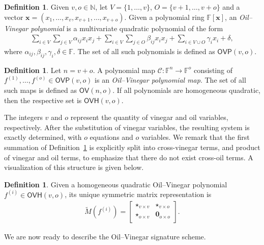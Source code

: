 \documentclass[12pt, a4paper, oneside]{memoir}
\theoremstyle{definition}
\newtheorem{definition}[theorem]{Definition}
\begin{document}
\begin{definition}\label{def:oil-vinegar-poly}
  Given $v, o \in \mathbb{N}$, let $V = \{1, \dots, v\}$, $O = \{v + 1, \dots, v + o\}$ and a vector $\mathbf{x} = (x_{1}, \dots, x_{v}, x_{v + 1}, \dots, x_{v + o})$. Given a polynomial ring $\mathbb{F}[\mathbf{x}]$, an \emph{Oil--Vinegar polynomial} is a multivariate quadratic polynomial of the form
  \begin{align}
    \sum_{i \in V} \sum_{j \in V} \alpha_{ij} x_{i} x_{j}
      + \sum_{i \in V} \sum_{j \in O} \beta_{ij} x_{i} x_{j}
      + \sum_{i \in V \cup O} \gamma_{i} x_{i}
      + \delta,
  \end{align}
  where $\alpha_{ij}, \beta_{ij}, \gamma_{i}, \delta \in \mathbb{F}$. The set of all such polynomials is defined as $\mathsf{OVP}(v, o)$.
\end{definition}

\begin{definition}
  Let $n = v + o$. A polynomial map $\mathcal{C} : \mathbb{F}^{n} \to \mathbb{F}^{o}$ consisting of $f^{(1)}, \dots, f^{(o)} \in \mathsf{OVP}(v, o)$ is an \emph{Oil--Vinegar polynomial map}. The set of all such maps is defined as $\mathsf{OV}(n, o)$. If all polynomials are homogeneous quadratic, then the respective set is $\mathsf{OVH}(v, o)$.
\end{definition}

The integers $v$ and $o$ represent the quantity of vinegar and oil variables, respectively. After the substitution of vinegar variables, the resulting system is exactly determined, with $o$ equations and $o$ variables. We remark that the first summation of Definition~\ref{def:oil-vinegar-poly} is explicitly split into cross-vinegar terms, and product of vinegar and oil terms, to emphasize that there do not exist cross-oil terms. A visualization of this structure is given below.

\begin{definition}\label{def:ovh-matrix}
  Given a homogeneous quadratic Oil--Vinegar polynomial $f^{(i)} \in \mathsf{OVH}(v, o)$, its unique symmetric matrix representation is
  \begin{align}
    \widetilde{M}(f^{(i)}) =
    \begin{bmatrix}
      \star_{v \times v} & \star_{v \times o} \\
      \star_{o \times v} & \mathbf{0}_{o \times o} \\
    \end{bmatrix}.
  \end{align}
\end{definition}
We are now ready to describe the Oil--Vinegar signature scheme.
\end{document}
